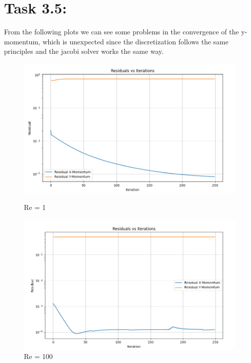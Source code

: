 \documentclass{article}
\begin{document}
\section*{\Large Task 3.5:}
From the following plots we can see some problems in the convergence of the y-momentum, which is unexpected since the discretization follows the same principles and the jacobi solver works the same way.
\begin{figure}[h!]
  \centering
  \begin{minipage}{0.32\textwidth}
    \centering
    \includegraphics[width=\textwidth]{Residual Re 1.png}
    \caption{Re = 1}
  \end{minipage}
  \begin{minipage}{0.32\textwidth}
    \centering
    \includegraphics[width=\textwidth]{Residual Re 10.png}
    \caption{Re = 100}
  \end{minipage}
  \begin{minipage}{0.32\textwidth}
    \centering

\end{minipage}
\end{figure}
\end{document}
